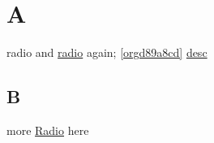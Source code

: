 \documentclass[11pt]{article}
\author{root}
\date{\today}
\title{}
\begin{document}
\tableofcontents

\section{A}
\label{sec:org89c6dde}
\label{org46141e9}radio and \hyperref[org46141e9]{radio} again; \label{orgd89a8cd} \ref{orgd89a8cd} \hyperref[orgd89a8cd]{desc}
\subsection{B}
\label{sec:org5c3cef1}
more \hyperref[org46141e9]{Radio} here
\end{document}
